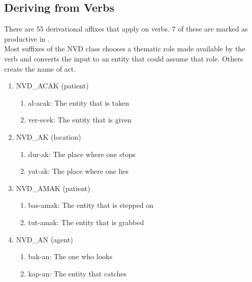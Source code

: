 \documentclass[11pt]{article} %
\begin{document}


\subsection{Deriving from Verbs}

\label{DerivVerbs}

There are 55 derivational affixes that apply on verbs. 7 of these are marked as productive in \citet{Bozsahin2018}. \\ 

Most suffixes of the NVD class chooses a thematic role made available by the verb and converts the input to an entity that could assume that role. Others create the name of act.

\begin{enumerate}[resume*]
	\item NVD\_ACAK (patient)
	\begin{enumerate}[label=(\alph*), ref=(\alph*)]\itemsep1pt
	\item al-acak: The entity that is taken
	\item ver-ecek: The entity that is given
	\end{enumerate}
	
	\item NVD\_AK (location)
	\begin{enumerate}[label=(\alph*), ref=(\alph*)]\itemsep1pt
	\item dur-ak: The place where one stops
	\item yat-ak: The place where one lies
	\end{enumerate}
	
	\item NVD\_AMAK (patient)
	\begin{enumerate}[label=(\alph*), ref=(\alph*)]\itemsep1pt
	\item bas-amak: The entity that is stepped on
	\item tut-amak: The entity that is grabbed
	\end{enumerate}
	
	\item NVD\_AN (agent)
	\begin{enumerate}[label=(\alph*), ref=(\alph*)]\itemsep1pt
	\item bak-an: The one who looks
	\item kap-an: The entity that catches
	\end{enumerate}
	

\end{enumerate}
\end{document}

